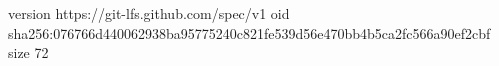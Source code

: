 version https://git-lfs.github.com/spec/v1
oid sha256:076766d440062938ba95775240c821fe539d56e470bb4b5ca2fc566a90ef2cbf
size 72

